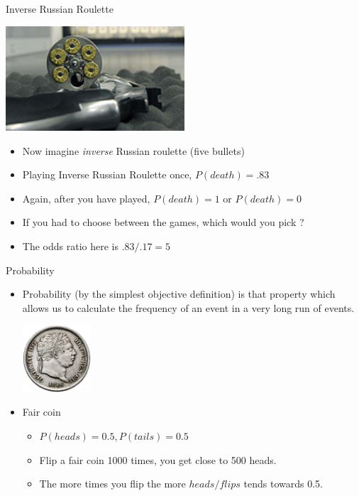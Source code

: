 \documentclass{beamer}
\begin{document}
\begin{frame}{Inverse Russian Roulette}
\centerline{\includegraphics[width=0.5\textwidth]{pics/inverserr.png}}
\begin{itemize}
\item Now imagine \emph{inverse} Russian roulette (five bullets)
\item Playing Inverse Russian Roulette once, $P(death) = .83$
\item Again, after you have played, $P(death) = 1$  or $P(death) = 0$ 
\item If you had to choose between the games, which would you pick ?
\item The odds ratio here is $.83/.17 = 5$ 
\end{itemize}
\end{frame}

\begin{frame}{Probability}
\begin{itemize}
\item Probability (by the simplest objective definition) is that property which
  allows us to calculate the frequency of an event in a very long run of
  events.

\centerline{\includegraphics[width=0.2\textwidth]{pics/coin.jpg}}
\item Fair coin 
\begin{itemize}
	\item $P(heads) = 0.5, P(tails) = 0.5$
	\item Flip a fair coin 1000 times, you get close to 500 heads.
	\item The more times you flip the more $heads/flips$ tends towards 0.5.
\end{itemize}
\end{itemize}
\end{frame}
\end{document}
